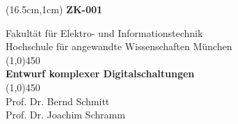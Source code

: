 \documentclass[a4paper]{scrreprt}
\begin{document}
\begin{titlepage}


\begin{textblock*}{50pt}(16.5cm,1cm)
	{\fontsize{60}{60} \textbf{\mbox{ZK-001}}}
\end{textblock*}


\centering
\vspace*{1cm}
\Large Fakult\"at f\"ur Elektro- und Informationstechnik \\
\Large Hochschule f\"ur angewandte Wissenschaften M\"unchen\\
\vspace*{4cm}
	\line(1,0){450}\\
	\Huge \textbf{Entwurf komplexer Digitalschaltungen} \\
	\line(1,0){450}\\

\huge Prof. Dr. Bernd Schmitt \\ Prof. Dr. Joachim Schramm \\
\end{titlepage}
\end{document}
